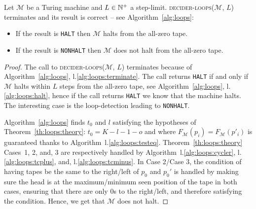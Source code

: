 \begin{theorem}\label{th:loops}
    Let $\mathcal{M}$ be a Turing machine and $L \in \mathbb{N}^+$ a step-limit. \textsc{decider-loops}($\mathcal{M}$, $L$) terminates and its result is correct -- see Algorithm~\ref{alg:loops}:
    \begin{itemize}
        \item If the result is \texttt{HALT} then $\mathcal{M}$ halts from the all-zero tape.
        \item If the result is \texttt{NONHALT} then $\mathcal{M}$ does not halt from the all-zero tape.
    \end{itemize}
\end{theorem}
\begin{proof}
    The call to \textsc{decider-loops}($\mathcal{M}$, $L$) terminates because of Algorithm~\ref{alg:loops}, l.\ref{alg:loops:terminate}. The call returns \texttt{HALT} if and only if $\mathcal{M}$ halts within $L$ steps from the all-zero tape, see Algorithm~\ref{alg:loops}, l.\ref{alg:loops:halt}, hence if the call returns \texttt{HALT} we know that the machine halts. The interesting case is the loop-detection leading to \texttt{NONHALT}.

    Algorithm~\ref{alg:loops} finds $t_0$ and $l$ satisfying the hypotheses of Theorem~\ref{th:loops:theory}: $t_0 = K-l-1-o$
    and where $F_\mathcal{M}(p_i)   = F_\mathcal{M}(p'_i)$ is guaranteed thanks to Algorithm~l.\ref{alg:loops:testeq}. Theorem~\ref{th:loops:theory} Cases~1, 2, and, 3 are respectively handled by Algorithm~l.\ref{alg:loops:cycler}, l.\ref{alg:loops:tcplus}, and, l.\ref{alg:loops:tcminus}. In Case 2/Case 3, the condition of having tapes be the same to the right/left of $p_0$ and $p_0'$ is handled by making sure the head is at the maximum/minimum seen position of the tape in both cases, ensuring that there are only 0s to the right/left, and therefore satisfying the condition. Hence, we get that $\mathcal{M}$ does not halt.
\end{proof}




